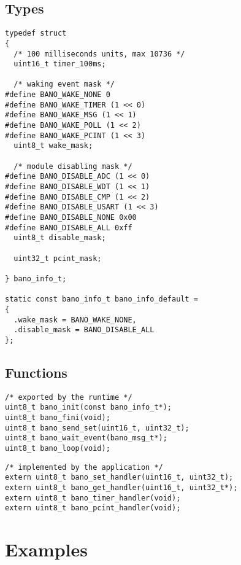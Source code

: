 \documentclass[a4paper, 11pt]{article}
\begin{document}
\subsection{Types}
\begin{scriptsize}
\begin{verbatim}
typedef struct
{
  /* 100 milliseconds units, max 10736 */
  uint16_t timer_100ms;

  /* waking event mask */
#define BANO_WAKE_NONE 0
#define BANO_WAKE_TIMER (1 << 0)
#define BANO_WAKE_MSG (1 << 1)
#define BANO_WAKE_POLL (1 << 2)
#define BANO_WAKE_PCINT (1 << 3)
  uint8_t wake_mask;

  /* module disabling mask */
#define BANO_DISABLE_ADC (1 << 0)
#define BANO_DISABLE_WDT (1 << 1)
#define BANO_DISABLE_CMP (1 << 2)
#define BANO_DISABLE_USART (1 << 3)
#define BANO_DISABLE_NONE 0x00
#define BANO_DISABLE_ALL 0xff
  uint8_t disable_mask;

  uint32_t pcint_mask;

} bano_info_t;

static const bano_info_t bano_info_default =
{
  .wake_mask = BANO_WAKE_NONE,
  .disable_mask = BANO_DISABLE_ALL
};
\end{verbatim}
\end{scriptsize}


\subsection{Functions}
\begin{scriptsize}
\begin{verbatim}
/* exported by the runtime */
uint8_t bano_init(const bano_info_t*);
uint8_t bano_fini(void);
uint8_t bano_send_set(uint16_t, uint32_t);
uint8_t bano_wait_event(bano_msg_t*);
uint8_t bano_loop(void);
\end{verbatim}
\end{scriptsize}

\begin{scriptsize}
\begin{verbatim}
/* implemented by the application */
extern uint8_t bano_set_handler(uint16_t, uint32_t);
extern uint8_t bano_get_handler(uint16_t, uint32_t*);
extern uint8_t bano_timer_handler(void);
extern uint8_t bano_pcint_handler(void);
\end{verbatim}
\end{scriptsize}

\clearpage
\section{Examples}
\end{document}
